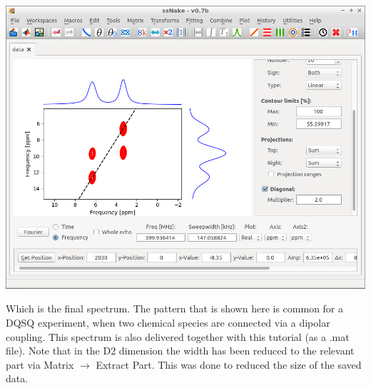 \documentclass[11pt,a4paper]{article}
\begin{document}
\begin{center}
\includegraphics[width=0.7\linewidth]{Figs/Fig8.png}
\end{center}
Which is the final spectrum.
The pattern that is shown here is common for a DQSQ experiment, when two chemical species are connected via a dipolar coupling.
This spectrum is also delivered together with this tutorial (as a .mat file).
Note that in the D2 dimension the width has been reduced to the relevant part via Matrix $\longrightarrow$ Extract Part.
This was done to reduced the size of the saved data.
\end{document}
